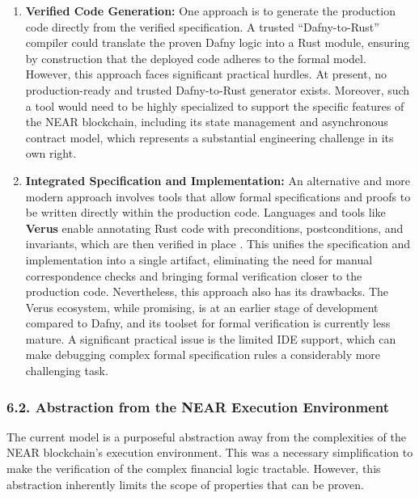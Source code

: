 \documentclass[
  english,
  onecolumn]{article}
\begin{document}
\begin{enumerate}
\def\labelenumi{\arabic{enumi}.}
\item
  \textbf{Verified Code Generation:} One approach is to generate the
  production code directly from the verified specification. A trusted
  ``Dafny-to-Rust'' compiler could translate the proven Dafny logic into
  a Rust module, ensuring by construction that the deployed code adheres
  to the formal model. However, this approach faces significant
  practical hurdles. At present, no production-ready and trusted
  Dafny-to-Rust generator exists. Moreover, such a tool would need to be
  highly specialized to support the specific features of the NEAR
  blockchain, including its state management and asynchronous contract
  model, which represents a substantial engineering challenge in its own
  right.
\item
  \textbf{Integrated Specification and Implementation:} An alternative
  and more modern approach involves tools that allow formal
  specifications and proofs to be written directly within the production
  code. Languages and tools like \textbf{Verus} enable annotating Rust
  code with preconditions, postconditions, and invariants, which are
  then verified in place . This
  unifies the specification and implementation into a single artifact,
  eliminating the need for manual correspondence checks and bringing
  formal verification closer to the production code. Nevertheless, this
  approach also has its drawbacks. The Verus ecosystem, while promising,
  is at an earlier stage of development compared to Dafny, and its
  toolset for formal verification is currently less mature. A
  significant practical issue is the limited IDE support, which can make
  debugging complex formal specification rules a considerably more
  challenging task.
\end{enumerate}

\subsubsection{6.2. Abstraction from the NEAR Execution
Environment}\label{abstraction-from-the-near-execution-environment}

The current model is a purposeful abstraction away from the complexities
of the NEAR blockchain's execution environment. This was a necessary
simplification to make the verification of the complex financial logic
tractable. However, this abstraction inherently limits the scope of
properties that can be proven.
\end{document}

